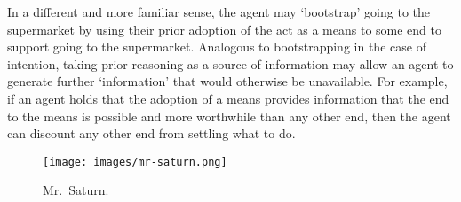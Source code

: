\documentclass[10pt]{article}
\newcommand{\hozline}[0]{%
  \noindent\hdashrule[0.5ex][c]{\textwidth}{.1pt}{}
}
\begin{document}
In a different and more familiar sense, the agent may `bootstrap' going to the supermarket by using their prior adoption of the act as a means to some end to support going to the supermarket.
Analogous to bootstrapping in the case of intention, taking prior reasoning as a source of information may allow an agent to generate further `information' that would otherwise be unavailable.
For example, if an agent holds that the adoption of a means provides information that the end to the means is possible and more worthwhile than any other end, then the agent can discount any other end from settling what to do.

\hozline

\vfill

\begin{figure}[h!]
  \centering
  \texttt{[image: images/mr-saturn.png]}
  \caption{Mr.\ Saturn.}
  \label{fig:mr-saturn}
\end{figure}

\newpage


\printbibliography
\end{document}
